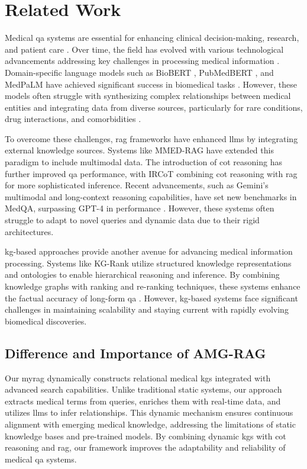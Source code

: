 \section{Related Work}

Medical \gls{qa} systems are essential for enhancing clinical decision-making, research, and patient care \cite{nazi2024large,liu2023utility,rezaei2024rag}. Over time, the field has evolved with various technological advancements addressing key challenges in processing medical information \cite{singhal2022large}. Domain-specific language models such as BioBERT \cite{lee2020biobert}, PubMedBERT \cite{gu2021domain}, and MedPaLM \cite{singhal2023large} have achieved significant success in biomedical tasks \cite{rohanian2024exploring}. However, these models often struggle with synthesizing complex relationships between medical entities and integrating data from diverse sources, particularly for rare conditions, drug interactions, and comorbidities \cite{zhou2023survey,yu2024large}.

To overcome these challenges, \gls{rag} frameworks \cite{rezaei2025vendirag,lewis2020retrieval} have enhanced \glspl{llm} by integrating external knowledge sources. Systems like MMED-RAG \cite{xia2024mmed} have extended this paradigm to include multimodal data. The introduction of \gls{cot} reasoning has further improved \gls{qa} performance, with IRCoT \cite{trivedi2022interleaving} combining \gls{cot} reasoning with \gls{rag} for more sophisticated inference. Recent advancements, such as Gemini's multimodal and long-context reasoning capabilities, have set new benchmarks in MedQA, surpassing GPT-4 in performance \cite{saab2024capabilities}. However, these systems often struggle to adapt to novel queries and dynamic data due to their rigid architectures.

\gls{kg}-based approaches provide another avenue for advancing medical information processing. Systems like KG-Rank \cite{huang2021knowledge} utilize structured knowledge representations and ontologies to enable hierarchical reasoning and inference. By combining knowledge graphs with ranking and re-ranking techniques, these systems enhance the factual accuracy of long-form \gls{qa} \cite{yang2024kg}. However, \gls{kg}-based systems face significant challenges in maintaining scalability and staying current with rapidly evolving biomedical discoveries.

\subsection*{Difference and Importance of AMG-RAG}

Our \gls{myrag} dynamically constructs relational medical \glspl{kg} integrated with advanced search capabilities. Unlike traditional static systems, our approach extracts medical terms from queries, enriches them with real-time data, and utilizes \glspl{llm} to infer relationships. This dynamic mechanism ensures continuous alignment with emerging medical knowledge, addressing the limitations of static knowledge bases and pre-trained models. By combining dynamic \glspl{kg} with \gls{cot} reasoning and \gls{rag}, our framework improves the adaptability and reliability of medical \gls{qa} systems.